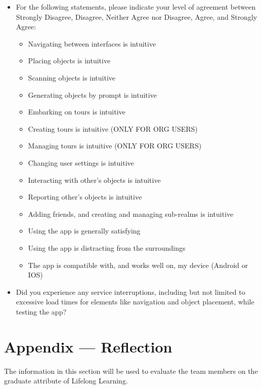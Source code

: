 \documentclass[12pt, titlepage]{article}
\begin{document}
\begin{itemize}
  \item For the following statements, please indicate your level of agreement between Strongly Disagree, Disagree, Neither Agree nor Disagree, Agree, and Strongly Agree:
        \begin{itemize}
          \item Navigating between interfaces is intuitive
          \item Placing objects is intuitive
          \item Scanning objects is intuitive
          \item Generating objects by prompt is intuitive
          \item Embarking on tours is intuitive
          \item Creating tours is intuitive (ONLY FOR ORG USERS)
          \item Managing tours is intuitive (ONLY FOR ORG USERS)
          \item Changing user settings is intuitive
          \item Interacting with other's objects is intuitive
          \item Reporting other's objects is intuitive
          \item Adding friends, and creating and managing sub-realms is intuitive
          \item Using the app is generally satisfying
          \item Using the app is distracting from the surroundings
          \item The app is compatible with, and works well on, my device (Android or IOS)
        \end{itemize}
  \item Did you experience any service interruptions, including but not limited to excessive load times for elements like navigation and object placement, while testing the app? \\
\end{itemize}

\newpage{}
\section*{Appendix --- Reflection}

The information in this section will be used to evaluate the team members on the
graduate attribute of Lifelong Learning.


\end{document}
